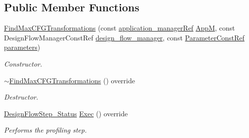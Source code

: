 \subsection*{Public Member Functions}
\begin{DoxyCompactItemize}
\item 
\hyperlink{classFindMaxCFGTransformations_a673dc6d1063056ac4fa2bfcd4764c25d}{Find\+Max\+C\+F\+G\+Transformations} (const \hyperlink{application__manager_8hpp_a04ccad4e5ee401e8934306672082c180}{application\+\_\+manager\+Ref} \hyperlink{classFrontendFlowStep_a0ac0d8db2a378416583f51c4faa59d15}{AppM}, const Design\+Flow\+Manager\+Const\+Ref \hyperlink{classDesignFlowStep_ab770677ddf087613add30024e16a5554}{design\+\_\+flow\+\_\+manager}, const \hyperlink{Parameter_8hpp_a37841774a6fcb479b597fdf8955eb4ea}{Parameter\+Const\+Ref} \hyperlink{classDesignFlowStep_a802eaafe8013df706370679d1a436949}{parameters})
\begin{DoxyCompactList}\small\item\em Constructor. \end{DoxyCompactList}\item 
\hyperlink{classFindMaxCFGTransformations_a2134f75f8255b2961ccfb65179f59821}{$\sim$\+Find\+Max\+C\+F\+G\+Transformations} () override
\begin{DoxyCompactList}\small\item\em Destructor. \end{DoxyCompactList}\item 
\hyperlink{design__flow__step_8hpp_afb1f0d73069c26076b8d31dbc8ebecdf}{Design\+Flow\+Step\+\_\+\+Status} \hyperlink{classFindMaxCFGTransformations_a6ac50147095421ddfda88a6fbb33e969}{Exec} () override
\begin{DoxyCompactList}\small\item\em Performs the profiling step. \end{DoxyCompactList}\end{DoxyCompactItemize}

